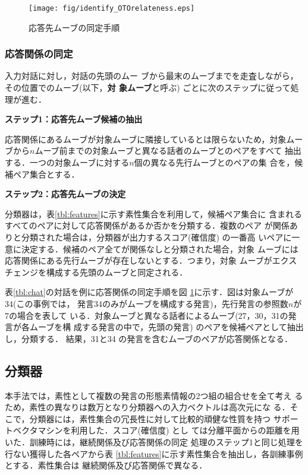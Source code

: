 \begin{figure}[tbt]
 \centerline{
    \texttt{[image: fig/identify\_OTOrelateness.eps]}
  }  
  \caption{応答先ムーブの同定手順}
  \label{fig:identify_OTOrelateness}
\end{figure}

\subsubsection{応答関係の同定}
入力対話に対し，対話の先頭のムー
ブから最末のムーブまでを走査しながら，その位置でのムーブ(以下，{\bf 対
象ムーブ}と呼ぶ) ごとに次のステップに従って処理が進む．

\begin{description}

\item{\bf ステップ1：応答先ムーブ候補の抽出}

応答関係にあるムーブが対象ムーブに隣接しているとは限らないため，対象ムー
ブから$n$ムーブ前までの対象ムーブと異なる話者のムーブとのペアをすべて
抽出する．一つの対象ムーブに対する$n$個の異なる先行ムーブとのペアの集
合を，候補ペア集合とする．

\item{\bf ステップ2：応答先ムーブの決定} 

分類器は，表\ref{tbl:features}に示す素性集合を利用して，候補ペア集合に
含まれるすべてのペアに対して応答関係があるか否かを分類する．複数のペア
が関係ありと分類された場合は，分類器が出力するスコア(確信度) の一番高
いペアに一意に決定する．候補のペア全てが関係なしと分類された場合，対象
ムーブには応答関係にある先行ムーブが存在しないとする．つまり，対象
ムーブがエクスチェンジを構成する先頭のムーブと同定される．

\end{description}

表\ref{tbl:chat}の対話を例に応答関係の同定手順を図
\ref{fig:identify_OTOrelateness}に示す．図は対象ムーブが34(この事例では，
発言34のみがムーブを構成する発言)，先行発言の参照数$n$が7の場合を表して
いる．対象ムーブと異なる話者によるムーブ(27，30，31の発言が各ムーブを構
成する発言の中で，先頭の発言) のペアを候補ペアとして抽出し，分類する． 
結果，31と34 の発言を含むムーブのペアが応答関係となる．

\subsection{分類器}
本手法では，素性として複数の発言の形態素情報の2つ組の組合せを全て考え
るため，素性の異なりは数万となり分類器への入力ベクトルは高次元にな
る．そこで，分類器には，素性集合の冗長性に対して比較的頑健な性質を持つ
サポートベクタマシン\cite{Vapnik1995a}を利用した．スコア(確信度) とし
ては分離平面からの距離を用いた．訓練時には，継続関係及び応答関係の同定
処理のステップ1と同じ処理を行ない獲得した各ペアから表
\ref{tbl:features}に示す素性集合を抽出し，各訓練事例とする．素性集合は
継続関係及び応答関係で異なる．


